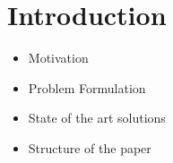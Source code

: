 \chapter{Introduction} \label{ch:intro}

\begin{itemize}
\item{Motivation}
\item{Problem Formulation}
\item{State of the art solutions}
\item{Structure of the paper}
\end{itemize}





